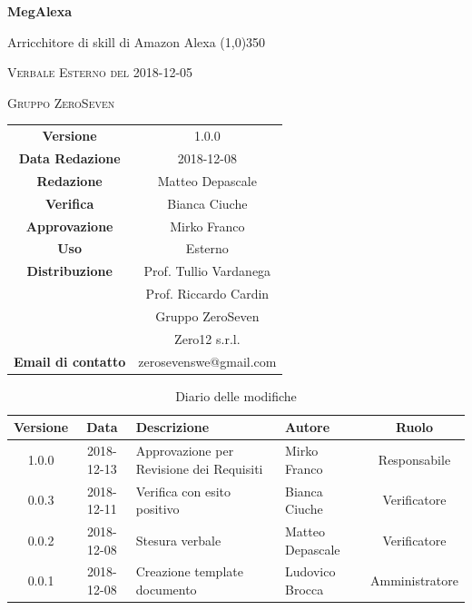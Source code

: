 \documentclass[a4paper,12pt]{article}
\author{Matteo Depascale}
\date{2018-12-08}
\begin{document}
\begin{titlepage}
	\centering
	{\huge\bfseries MegAlexa\par}
	Arricchitore di skill di Amazon Alexa
	\line(1,0){350} \\
	{\scshape\LARGE Verbale Esterno del 2018-12-05 \par}
	\vspace{1cm}
	{\scshape Gruppo ZeroSeven \par}
	\logo
	\begin{tabular}{c|c}
		{\hfill \textbf{Versione}} 			& 1.0.0				\\
		{\hfill\textbf{Data Redazione}} 	& 2018-12-08		\\ 
		{\hfill\textbf{Redazione}} 			&  		Matteo Depascale			\\ 
		{\hfill\textbf{Verifica}} 				&  		Bianca Ciuche		\\ 
		{\hfill\textbf{Approvazione}} 		&  		Mirko Franco	\\ 
		{\hfill\textbf{Uso}} 					& 	Esterno	\\ 
		{\hfill\textbf{Distribuzione}} 			& 			Prof. Tullio Vardanega \\ & Prof. Riccardo Cardin \\ & Gruppo ZeroSeven \\ & Zero12 s.r.l.	\\ 
		{\hfill\textbf{Email di contatto}} & zerosevenswe@gmail.com \\
	\end{tabular}
\end{titlepage}
	

	
	\label{LastFrontPage}
	

	\newpage
	\cleardoublepage
		\begin{table}[tbph]
		\centering
		\begin{tabularx}{\textwidth}{|c|c|X|X|c|}
			\hline
			\textbf{Versione} & \textbf{Data} & \textbf{Descrizione} & \textbf{Autore} & \textbf{Ruolo} \\
			\hline
			1.0.0 & 2018-12-13 & Approvazione per Revisione dei Requisiti & Mirko Franco & Responsabile \\
			\hline
			0.0.3 & 2018-12-11 & Verifica con esito positivo & Bianca Ciuche & Verificatore \\
			\hline
			0.0.2 & 2018-12-08 & Stesura verbale & Matteo Depascale & Verificatore \\
			\hline
			0.0.1 & 2018-12-08 & Creazione template documento
			& Ludovico Brocca & Amministratore\\
			\hline
		\end{tabularx}
		\caption{Diario delle modifiche}
	\end{table}
	
\end{document}
